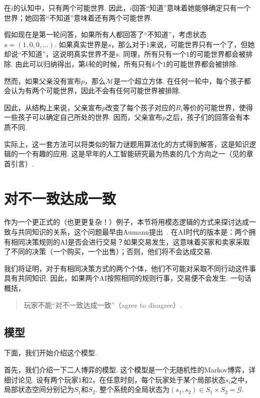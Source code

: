 在$i$的认知中，只有两个可能世界. 因此，$i$回答“知道”意味着她能够确定只有一个世界；她回答“不知道”意味着还有两个可能世界. 

假如现在是第一轮问答，如果所有人都回答了“不知道”，考虑状态$s=(1,0,0,\dots)$. 如果真实世界是$s$，那么对于$1$来说，可能世界只有一个了，但她却说“不知道”，这说明真实世界不是$s$. 同理，所有只有一个$1$的可能世界都会被排除. 由此可以归纳得出，第$k$轮的时候，所有只有$k$个$1$的可能世界都会被排除. 

然而，如果父亲没有宣布$p$，那么$\mathcal{M}$是一个超立方体. 在任何一轮中，每个孩子都会认为有两个可能世界，因此不会有任何可能世界被排除. 

因此，从结构上来说，父亲宣布$p$改变了每个孩子对应的$R_i$等价的可能世界，使得一些孩子可以确定自己所处的世界. 因而，父亲宣布$p$之后，孩子们的回答会有本质不同. 

实际上，这一套方法可以将类似的智力谜题用算法化的方式得到解答，这是知识逻辑的一个有趣的应用. 这是早年的人工智能研究最为热衷的几个方向之一（见的章首引言）. 

\section{对不一致达成一致}

作为一个更正式的（也更更复杂！）例子，本节将用模态逻辑的方式来探讨达成一致与共同知识的关系，这个问题最早由Aumann提出~\cite{aumannAgreeingDisagree1976}. 在AI时代的版本是：两个拥有相同决策规则的AI是否会进行交易？如果交易发生，这意味着买家和卖家采取了不同的决策（一个购买，一个出售）；否则，他们将不会达成交易. 

我们将证明，对于有相同决策方式的两个个体，他们不可能对采取不同行动这件事具有共同知识. 因此，如果两个AI按照相同的规则行事，交易便不会发生. 一句话概括，\
\begin{quotation}
    玩家不能“对不一致达成一致”（agree to disagree）. 
\end{quotation}

\subsection{模型}

下面，我们开始介绍这个模型. 

首先，我们介绍一下二人博弈的模型. 这个模型是一个无随机性的Markov博弈，详细讨论见. 设有两个玩家1和2，在任意时刻，每个玩家处于某个局部状态$s_i$之中，局部状态空间分别记为$S_1$和$S_2$. 整个系统的全局状态为$(s_1, s_2) \in S_1 \times S_2 = \mathcal{G}$. 

